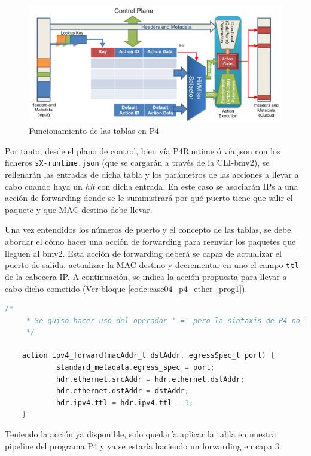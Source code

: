 \begin{figure}[ht]
    \centering
    \includegraphics[width=16cm]{archivos/img/dev/p4/case04/table.png}
    \caption{Funcionamiento de las tablas en P4 \cite{p42}}
    \label{fig:case03_p4_ether_tablas}
\end{figure}
\vspace{0.2cm}

Por tanto, desde el plano de control, bien vía P4Runtime ó vía json con los ficheros \texttt{sX-runtime.json} (que se cargarán a través de la CLI-\gls{bmv2}), se rellenarán las entradas de dicha tabla y los parámetros de las acciones a llevar a cabo cuando haya un \textit{hit} con dicha entrada. En este caso se asociarán IPs a una acción de forwarding donde  se le  suministrará por qué puerto tiene que salir el paquete y que MAC destino debe llevar.\\
\par

Una vez entendidos los números de puerto y el concepto de las tablas, se debe abordar el cómo hacer una acción de forwarding para reenviar los paquetes que lleguen al \gls{bmv2}. Esta acción de forwarding deberá se capaz de actualizar el puerto de salida, actualizar la MAC destino y decrementar en uno el campo \texttt{ttl} de la cabecera IP. A continuación, se indica la acción propuesta para llevar a cabo dicho cometido (Ver bloque \ref{code:case04_p4_ether_prog1}).

\begin{lstlisting}[language=C, style=P4-color, caption={Acción propuesta para llevar a cabo el forwarding - Case04},label=code:case04_p4_ether_prog2]
    /*
     * Se quiso hacer uso del operador '-=' pero la sintaxis de P4 no lo permite :(
     */
    
    action ipv4_forward(macAddr_t dstAddr, egressSpec_t port) {
            standard_metadata.egress_spec = port;
            hdr.ethernet.srcAddr = hdr.ethernet.dstAddr;
            hdr.ethernet.dstAddr = dstAddr;
            hdr.ipv4.ttl = hdr.ipv4.ttl - 1;
    }
\end{lstlisting}
\vspace{0.5cm}
Teniendo la acción ya disponible, solo quedaría aplicar la tabla en nuestra pipeline del programa P4 y ya se estaría haciendo un forwarding en capa 3.

